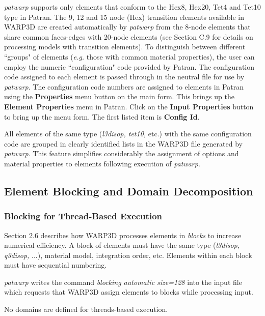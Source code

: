 \documentclass[11pt]{report}
\numberwithin{equation}{section}
\begin{document}
\textit{patwarp} supports only elements that conform to the Hex8, Hex20, Tet4 and Tet10
type in Patran. The 9, 12 and 15 node (Hex) transition elements available in
WARP3D are created automatically by \textit{patwarp} from the 8-node elements that share
common faces-edges with 20-node elements (see Section C.9 for details on
processing models with transition elements). To distinguish between different
``groups" of elements (\textit{e.g.} those with common material properties), the user can
employ the numeric ``configuration" code provided by Patran. The configuration
code assigned to each element is passed through in the neutral file for use by
\textit{patwarp}. The configuration code numbers are assigned to elements in Patran using
the \textbf{Properties} menu button on the main form. This brings up the \textbf{Element
Properties} menu in Patran. Click on the \textbf{Input Properties} button to bring up the
menu form. The first listed item is \textbf{Config Id}.

All elements of the same type (\textit{l3disop, tet10,} etc.) with the same configuration
code are grouped in clearly identified lists in the WARP3D file generated by
\textit{patwarp}. This feature simplifies considerably the assignment of options and
material properties to elements following execution of \textit{patwarp}.

\subsection{Element Blocking and Domain Decomposition}
\subsubsection{Blocking for Thread-Based Execution}
\noindent Section 2.6 describes how WARP3D processes elements in \textit{blocks} 
to increase numerical efficiency. A block of elements must have the same type
(\textit{l3disop, q3disop,} ...), material model, integration order, etc. Elements within
each block must have sequential numbering. 

\textit{patwarp} writes the command \textit{blocking automatic size=128} into the input file
which requests that WARP3D assign elements to blocks while processing input.


No domains are defined for threads-based execution.
\end{document}
